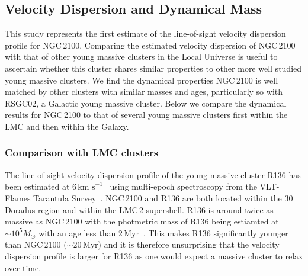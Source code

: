 \documentclass[useAMS,usenatbib]{mn2e}
\def\kms{$\mbox{km s}^{-1}$}
\begin{document}
\subsection{Velocity Dispersion and Dynamical Mass} %
\label{sub:velocity_dispersion_Mdyn}


This study represents the first estimate of the line-of-sight velocity dispersion profile for NGC\,2100.
Comparing the estimated velocity dispersion of NGC\,2100 with that of other young massive clusters in the Local Universe is useful to ascertain whether this cluster shares similar properties to other more well studied young massive clusters.
We find the dynamical properties NGC\,2100 is well matched by other clusters with similar masses and ages, particularly so with RSGC02, a Galactic young massive cluster.
Below we compare the dynamical results for NGC\,2100 to that of several young massive clusters first within the LMC and then within the Galaxy.

\subsubsection{Comparison with LMC clusters} %
\label{sub:comparison_with_lmc_clusters}


The line-of-sight velocity dispersion profile of the young massive cluster R136 has been estimated at 6\,\kms~\citep{2012A&A...546A..73H} using multi-epoch spectroscopy from the VLT-Flames Tarantula Survey~\citep{2011A&A...530A.108E}.
NGC\,2100 and R136 are both located within the 30 Doradus region and within the LMC\,2 supershell.
R136 is around twice as massive as NGC\,2100 with the photmetric mass of R136 being estiamted at $\sim10^{5}M_{\odot}$ with an age less than 2\,Myr~\citep{1998ApJ...509..879D,1998ApJ...493..180M,2010MNRAS.408..731C}.
This makes R136 significantly younger than NGC\,2100 ($\sim20$\,Myr) and it is therefore unsurprising that the velocity dispersion profile is larger for R136 as one would expect a massive cluster to relax over time.
\end{document}
